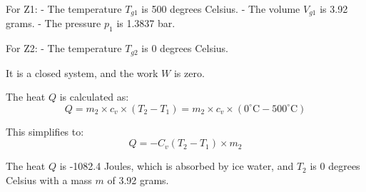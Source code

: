For Z1:
- The temperature \( T_{g1} \) is 500 degrees Celsius.
- The volume \( V_{g1} \) is 3.92 grams.
- The pressure \( p_{1} \) is 1.3837 bar.

For Z2:
- The temperature \( T_{g2} \) is 0 degrees Celsius.

It is a closed system, and the work \( W \) is zero.

The heat \( Q \) is calculated as:
\[ Q = m_{2} \times c_{v} \times (T_{2} - T_{1}) = m_{2} \times c_{v} \times (0^\circ \text{C} - 500^\circ \text{C}) \]

This simplifies to:
\[ Q = -C_{v}(T_{2} - T_{1}) \times m_{2} \]

The heat \( Q \) is -1082.4 Joules, which is absorbed by ice water, and \( T_{2} \) is 0 degrees Celsius with a mass \( m \) of 3.92 grams.
